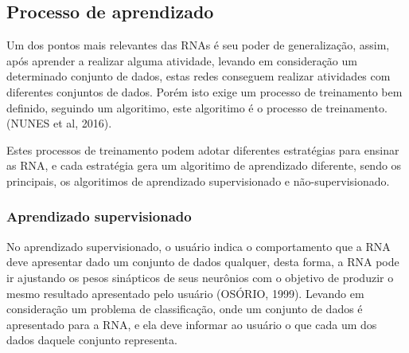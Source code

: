 

\subsection{Processo de aprendizado}

Um dos pontos mais relevantes das RNAs é seu poder de generalização, assim, após aprender a realizar alguma atividade, levando em consideração um determinado conjunto de dados, estas redes conseguem realizar atividades com diferentes conjuntos de dados. Porém isto exige um processo de treinamento bem definido, seguindo um algoritimo, este algoritimo é o processo de treinamento. (NUNES et al, 2016).

Estes processos de treinamento podem adotar diferentes estratégias para ensinar as RNA, e cada estratégia gera um algoritimo de aprendizado diferente, sendo os principais, os algoritimos de aprendizado supervisionado e não-supervisionado.

\subsubsection{Aprendizado supervisionado}

No aprendizado supervisionado, o usuário indica o comportamento que a RNA deve apresentar dado um conjunto de dados qualquer, desta forma, a RNA pode ir ajustando os pesos sinápticos de seus neurônios com o objetivo de produzir o mesmo resultado apresentado pelo usuário (OSÓRIO, 1999). Levando em consideração um problema de classificação, onde um conjunto de dados é apresentado para a RNA, e ela deve informar ao usuário o que cada um dos dados daquele conjunto representa.


